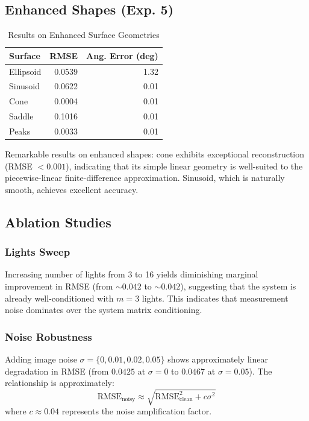 \documentclass[11pt]{article}
\begin{document}
\subsection{Enhanced Shapes (Exp. 5)}

\begin{table}[!t]
\centering
\caption{Results on Enhanced Surface Geometries}
\begin{tabular}{|l|r|r|}
\hline
\textbf{Surface} & \textbf{RMSE} & \textbf{Ang. Error (deg)} \\
\hline
Ellipsoid & 0.0539 & 1.32 \\
Sinusoid & 0.0622 & 0.01 \\
Cone & 0.0004 & 0.01 \\
Saddle & 0.1016 & 0.01 \\
Peaks & 0.0033 & 0.01 \\
\hline
\end{tabular}
\end{table}

Remarkable results on enhanced shapes: cone exhibits exceptional reconstruction (RMSE $< 0.001$), indicating that its simple linear geometry is well-suited to the piecewise-linear finite-difference approximation. Sinusoid, which is naturally smooth, achieves excellent accuracy.

\subsection{Ablation Studies}

\subsubsection{Lights Sweep}

Increasing number of lights from 3 to 16 yields diminishing marginal improvement in RMSE (from $\sim 0.042$ to $\sim 0.042$), suggesting that the system is already well-conditioned with $m=3$ lights. This indicates that measurement noise dominates over the system matrix conditioning.

\subsubsection{Noise Robustness}

Adding image noise $\sigma = \{0, 0.01, 0.02, 0.05\}$ shows approximately linear degradation in RMSE (from $0.0425$ at $\sigma=0$ to $0.0467$ at $\sigma=0.05$). The relationship is approximately:
\begin{equation}
\text{RMSE}_{\text{noisy}} \approx \sqrt{\text{RMSE}_{\text{clean}}^2 + c \sigma^2}
\end{equation}
where $c \approx 0.04$ represents the noise amplification factor.
\end{document}
